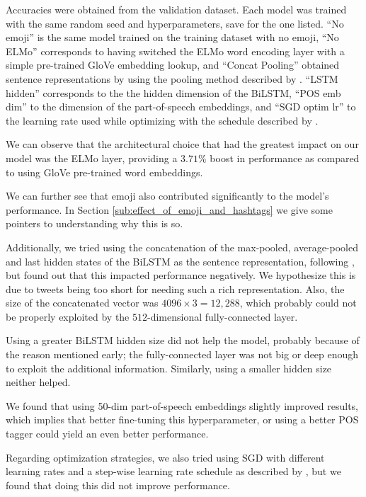 \documentclass[11pt,a4paper]{article}
\begin{document}
Accuracies were obtained from the
validation dataset. Each model was trained with the same random seed and hyperparameters, save for the one listed. ``No emoji'' is the same model trained on the training dataset with no emoji, ``No ELMo'' corresponds to having switched the ELMo word encoding layer with a simple pre-trained GloVe embedding lookup, and ``Concat Pooling'' obtained sentence representations by using the pooling method described by \citet{howard2018universal}. ``LSTM hidden'' corresponds to the the hidden dimension of the BiLSTM, ``POS emb dim'' to the dimension of the part-of-speech embeddings, and ``SGD optim lr'' to the learning rate used while optimizing with the schedule described by \citet{conneau2017supervised}.

We can observe that the architectural choice that had the greatest impact on our model was the ELMo layer, providing a $3.71\%$ boost in performance as compared to using GloVe pre-trained word embeddings.

We can further see that emoji also contributed significantly to the model's performance. In Section \ref{sub:effect_of_emoji_and_hashtags} we give some pointers to understanding why this is so.  

Additionally, we tried using the concatenation of the max-pooled, average-pooled and last hidden states of the BiLSTM as the sentence representation, following \citet{howard2018universal}, but found out that this impacted performance negatively. We hypothesize this is due to tweets being too short for needing such a rich representation. Also, the size of the concatenated vector was $4096\times3=12,288$, which probably could not be properly exploited by the $512$-dimensional fully-connected layer.

Using a greater BiLSTM hidden size did not help the model, probably because of the reason mentioned early; the fully-connected layer was not big or deep enough to exploit the additional information. Similarly, using a smaller hidden size neither helped.

We found that using 50-dim part-of-speech embeddings slightly improved results, which implies that better fine-tuning this hyperparameter, or using a better POS tagger could yield an even better performance.

Regarding optimization strategies, we also tried using SGD with different learning rates and a step-wise learning rate schedule as described by \citet{conneau2018}, but we found that doing this did not improve performance. 
\end{document}
